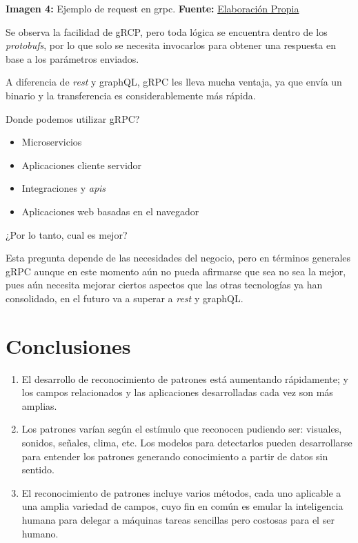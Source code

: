 \documentclass[12pt,spanish,Letterpaper,openany]{book}
\providecommand{\tightlist}{%
  \setlength{\itemsep}{0pt}\setlength{\parskip}{0pt}}
\begin{document}


\textbf{Imagen 4:} Ejemplo de request en grpc. \textbf{Fuente:} \href{}{Elaboración Propia}



Se observa la facilidad de gRCP, pero toda lógica se encuentra dentro de los \emph{protobufs}, por lo que solo se necesita invocarlos para obtener una respuesta en base a los parámetros enviados.

A diferencia de \emph{rest} y graphQL, gRPC les lleva mucha ventaja, ya que envía un binario y la transferencia es considerablemente más rápida.

Donde podemos utilizar gRPC?

\begin{itemize}
\tightlist
\item
  Microservicios
\item
  Aplicaciones cliente servidor
\item
  Integraciones y \emph{apis}
\item
  Aplicaciones web basadas en el navegador
\end{itemize}

¿Por lo tanto, cual es mejor?

Esta pregunta depende de las necesidades del negocio, pero en términos generales gRPC aunque en este momento aún no pueda afirmarse que sea no sea la mejor, pues aún necesita mejorar ciertos aspectos que las otras tecnologías ya han consolidado, en el futuro va a superar a \emph{rest} y graphQL.

\hypertarget{conclusiones-12}{%
\section*{Conclusiones}\label{conclusiones-12}}

\begin{enumerate}
\def\labelenumi{\arabic{enumi}.}
\item
  El desarrollo de reconocimiento de patrones está aumentando rápidamente; y los campos relacionados y las aplicaciones desarrolladas cada vez son más amplias.
\item
  Los patrones varían según el estímulo que reconocen pudiendo ser: visuales, sonidos, señales, clima, etc. Los modelos para detectarlos pueden desarrollarse para entender los patrones generando conocimiento a partir de datos sin sentido.
\item
  El reconocimiento de patrones incluye varios métodos, cada uno aplicable a una amplia variedad de campos, cuyo fin en común es emular la inteligencia humana para delegar a máquinas tareas sencillas pero costosas para el ser humano.
\end{enumerate}
\end{document}
